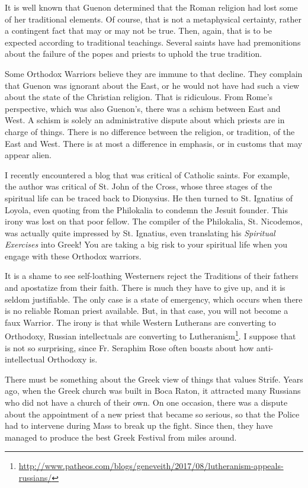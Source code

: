 It is well known that Guenon determined that the Roman religion had lost some of her traditional elements. Of course, that is not a metaphysical certainty, rather a contingent fact that may or may not be true. Then, again, that is to be expected according to traditional teachings. Several saints have had premonitions about the failure of the popes and priests to uphold the true tradition.

Some Orthodox Warriors believe they are immune to that decline. They complain that Guenon was ignorant about the East, or he would not have had such a view about the state of the Christian religion. That is ridiculous. From Rome's perspective, which was also Guenon's, there was a schism between East and West. A schism is solely an administrative dispute about which priests are in charge of things. There is no difference between the religion, or tradition, of the East and West. There is at most a difference in emphasis, or in customs that may appear alien.

I recently encountered a blog that was critical of Catholic saints. For example, the author was critical of St. John of the Cross, whose three stages of the spiritual life can be traced back to Dionysius. He then turned to St. Ignatius of Loyola, even quoting from the Philokalia to condemn the Jesuit founder. This irony was lost on that poor fellow. The compiler of the Philokalia, St. Nicodemos, was actually quite impressed by St. Ignatius, even translating his \emph{Spiritual Exercises} into Greek! You are taking a big risk to your spiritual life when you engage with these Orthodox warriors.

It is a shame to see self-loathing Westerners reject the Traditions of their fathers and apostatize from their faith. There is much they have to give up, and it is seldom justifiable. The only case is a state of emergency, which occurs when there is no reliable Roman priest available. But, in that case, you will not become a faux Warrior. The irony is that while Western Lutherans are converting to Orthodoxy, Russian intellectuals are converting to Lutheranism\footnote{\url{http://www.patheos.com/blogs/geneveith/2017/08/lutheranism-appeals-russians/}}. I suppose that is not so surprising, since Fr. Seraphim Rose often boasts about how anti-intellectual Orthodoxy is.

There must be something about the Greek view of things that values Strife. Years ago, when the Greek church was built in Boca Raton, it attracted many Russians who did not have a church of their own. On one occasion, there was a dispute about the appointment of a new priest that became so serious, so that the Police had to intervene during Mass to break up the fight. Since then, they have managed to produce the best Greek Festival from miles around.

